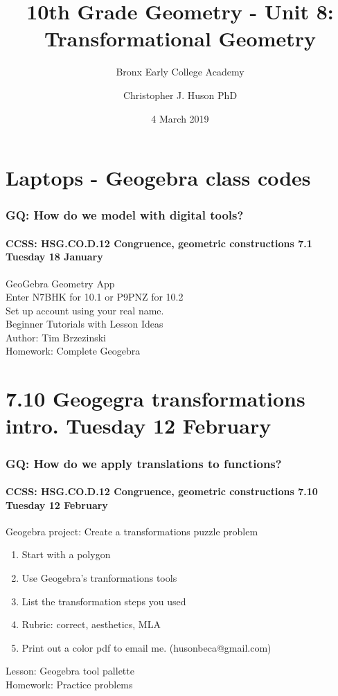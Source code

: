 \documentclass{beamer}
\title{10th Grade Geometry - Unit 8: Transformational Geometry}
\subtitle{Bronx Early College Academy}
\author{Christopher J. Huson PhD}
\date{4 March 2019}
\begin{document}
\frame{\titlepage}
\section[Outline]{}
\frame{\tableofcontents}


\section{Laptops - Geogebra class codes}
  \frame
  {
    \frametitle{GQ: How do we model with digital tools?}
    \framesubtitle{CCSS: HSG.CO.D.12 Congruence, geometric constructions  \alert{7.1 Tuesday 18 January}}

    GeoGebra Geometry App\\
    Enter \alert{N7BHK} for 10.1 or \alert{P9PNZ} for 10.2\\
    Set up account using your real name.\\
    Beginner Tutorials with Lesson Ideas\\
    Author: Tim Brzezinski\\[0.5cm]
    Homework: Complete Geogebra
  }

\section{7.10 Geogegra transformations intro. Tuesday 12 February}
  \frame
  {
    \frametitle{GQ: How do we apply translations to functions?}
    \framesubtitle{CCSS: HSG.CO.D.12 Congruence, geometric constructions \hfill \alert{7.10 Tuesday 12 February}}

    \begin{block}{Geogebra project: Create a transformations puzzle problem}
      \begin{enumerate}
        \item Start with a polygon
        \item Use Geogebra's tranformations tools
        \item List the transformation steps you used
        \item Rubric: correct, aesthetics, MLA
        \item Print out a color pdf to email me. (husonbeca@gmail.com)
      \end{enumerate}
    \end{block}
    Lesson: Geogebra tool pallette\\[0.5cm]
    Homework: Practice problems
  }
\end{document}
